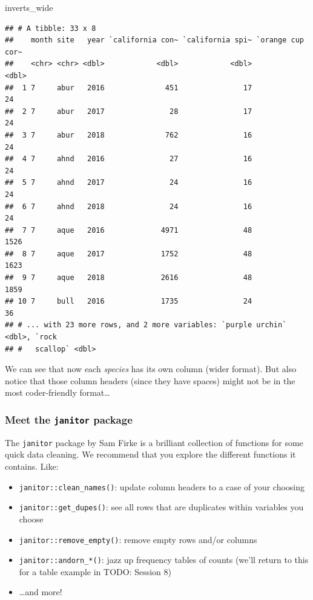 \documentclass[]{book}
\newenvironment{Shaded}{\begin{snugshade}}{\end{snugshade}}
\newcommand{\NormalTok}[1]{#1}
\providecommand{\tightlist}{%
  \setlength{\itemsep}{0pt}\setlength{\parskip}{0pt}}
\begin{document}
\begin{Shaded}
\begin{Highlighting}[]
\NormalTok{inverts_wide}
\end{Highlighting}
\end{Shaded}

\begin{verbatim}
## # A tibble: 33 x 8
##    month site   year `california con~ `california spi~ `orange cup cor~
##    <chr> <chr> <dbl>            <dbl>            <dbl>            <dbl>
##  1 7     abur   2016              451               17               24
##  2 7     abur   2017               28               17               24
##  3 7     abur   2018              762               16               24
##  4 7     ahnd   2016               27               16               24
##  5 7     ahnd   2017               24               16               24
##  6 7     ahnd   2018               24               16               24
##  7 7     aque   2016             4971               48             1526
##  8 7     aque   2017             1752               48             1623
##  9 7     aque   2018             2616               48             1859
## 10 7     bull   2016             1735               24               36
## # ... with 23 more rows, and 2 more variables: `purple urchin` <dbl>, `rock
## #   scallop` <dbl>
\end{verbatim}

We can see that now each \emph{species} has its own column (wider format). But also notice that those column headers (since they have spaces) might not be in the most coder-friendly format\ldots{}

\hypertarget{meet-the-janitor-package}{%
\subsubsection{\texorpdfstring{Meet the \texttt{janitor} package}{Meet the janitor package}}\label{meet-the-janitor-package}}

The \texttt{janitor} package by Sam Firke is a brilliant collection of functions for some quick data cleaning. We recommend that you explore the different functions it contains. Like:

\begin{itemize}
\tightlist
\item
  \texttt{janitor::clean\_names()}: update column headers to a case of your choosing
\item
  \texttt{janitor::get\_dupes()}: see all rows that are duplicates within variables you choose
\item
  \texttt{janitor::remove\_empty()}: remove empty rows and/or columns
\item
  \texttt{janitor::andorn\_*()}: jazz up frequency tables of counts (we'll return to this for a table example in TODO: Session 8)
\item
  \ldots{}and more!
\end{itemize}
\end{document}
